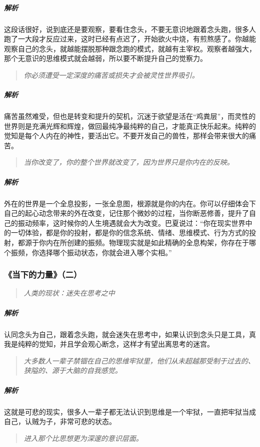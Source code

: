 \subparagraph{解析} 这段话很好，说到底还是要观察，要看住念头，不要无意识地跟着念头跑，很多人跑了一大段才反应过来，这时已经有点迟了，开始欲火中烧，有煎熬感了。你越能观察自己的念头，就越能摆脱那种跟念跑的模式，就越有主宰权。观察者越强大，那个无意识的思维模式就会越弱，所以要不断提升自己的觉察力。

\begin{quote}\it
    你必须遭受一定深度的痛苦或损失才会被灵性世界吸引。
\end{quote}

\subparagraph{解析} 痛苦虽然难受，但也是转变和提升的契机，沉迷于欲望是活在“鸡粪层”，而灵性的世界则是充满光辉和辉煌，做回最纯净最纯粹的自己，才能真正快乐起来。纯粹的觉知是每个人内在的神性，要活出它。不要开发自己的兽性，那样会带来很大的痛苦。

\begin{quote}\it
    当你改变了，你的整个世界就改变了，因为世界只是你内在的反映。
\end{quote}

\subparagraph{解析} 外在的世界是一个全息投影，一张全息图，根源就是你的内在。你可以仔细体会下自己的起心动念带来的外在改变，记住那个微妙的过程，当你断恶修善，提升了自己的振动频率，这时候你的人生境遇就会大为改变。巴夏说过：“你在现实世界中的一切体验，都是你的投射，都是你的信念系统、情绪、思维模式、行为方式的投射，都源于你内在所创建的振频。物理现实就是如此精确的全息构架，你存在于哪个振频，你选择哪个振动状态，你就会进入哪个实相。”

\subsubsection{《当下的力量》（二）}

\begin{quote}\it
    人类的现状：迷失在思考之中
\end{quote}

\subparagraph{解析} 认同念头为自己，跟着念头跑，就会迷失在思考中，如果认识到念头只是工具，真我是纯粹的觉知，并且学会观心断念，这样才有望出离思考的迷宫。

\begin{quote}\it
    大多数人一辈子禁锢在自己的思维牢狱里，他们从未超越那受制于过去的、狭隘的、源于大脑的自我感觉。
\end{quote}

\subparagraph{解析} 这就是可悲的现实，很多人一辈子都无法认识到思维是一个牢狱，一直把牢狱当成自己，认贼为子，非常可悲的状态。

\begin{quote}\it
    进入那个比思想更为深邃的意识层面。
\end{quote}

